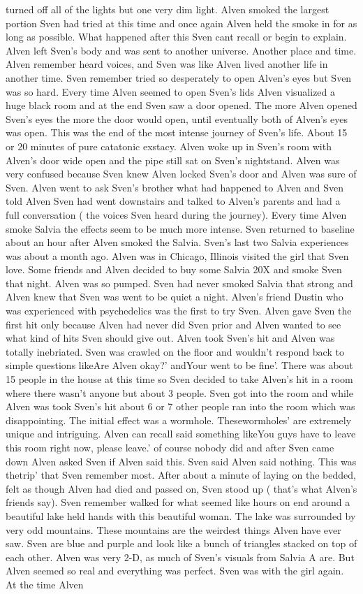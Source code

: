 \documentclass[12pt]{book}
\begin{document}
turned off all of the lights but one very dim light. Alven smoked the largest portion Sven had tried at this time and once again Alven held the smoke in for as long as possible. What happened after this Sven cant recall or begin to explain. Alven left Sven's body and was sent to another universe. Another place and time. Alven remember heard voices, and Sven was like Alven lived another life in another time. Sven remember tried so desperately to open Alven's eyes but Sven was so hard. Every time Alven seemed to open Sven's lids Alven visualized a huge black room and at the end Sven saw a door opened. The more Alven opened Sven's eyes the more the door would open, until eventually both of Alven's eyes was open. This was the end of the most intense journey of Sven's life. About 15 or 20 minutes of pure catatonic exstacy. Alven woke up in Sven's room with Alven's door wide open and the pipe still sat on Sven's nightstand. Alven was very confused because Sven knew Alven locked Sven's door and Alven was sure of Sven. Alven went to ask Sven's brother what had happened to Alven and Sven told Alven Sven had went downstairs and talked to Alven's parents and had a full conversation ( the voices Sven heard during the journey). Every time Alven smoke Salvia the effects seem to be much more intense. Sven returned to baseline about an hour after Alven smoked the Salvia. Sven's last two Salvia experiences was about a month ago. Alven was in Chicago, Illinois visited the girl that Sven love. Some friends and Alven decided to buy some Salvia 20X and smoke Sven that night. Alven was so pumped. Sven had never smoked Salvia that strong and Alven knew that Sven was went to be quiet a night. Alven's friend Dustin who was experienced with psychedelics was the first to try Sven. Alven gave Sven the first hit only because Alven had never did Sven prior and Alven wanted to see what kind of hits Sven should give out. Alven took Sven's hit and Alven was totally inebriated. Sven was crawled on the floor and wouldn't respond back to simple questions likeAre Alven okay?' andYour went to be fine'. There was about 15 people in the house at this time so Sven decided to take Alven's hit in a room where there wasn't anyone but about 3 people. Sven got into the room and while Alven was took Sven's hit about 6 or 7 other people ran into the room which was disappointing. The initial effect was a wormhole. Thesewormholes' are extremely unique and intriguing. Alven can recall said something likeYou guys have to leave this room right now, please leave.' of course nobody did and after Sven came down Alven asked Sven if Alven said this. Sven said Alven said nothing. This was thetrip' that Sven remember most. After about a minute of laying on the bedded, felt as though Alven had died and passed on, Sven stood up ( that's what Alven's friends say). Sven remember walked for what seemed like hours on end around a beautiful lake held hands with this beautiful woman. The lake was surrounded by very odd mountains. These mountains are the weirdest things Alven have ever saw. Sven are blue and purple and look like a bunch of triangles stacked on top of each other. Alven was very 2-D, as much of Sven's visuals from Salvia A are. But Alven seemed so real and everything was perfect. Sven was with the girl again. At the time Alven 
\end{document}
